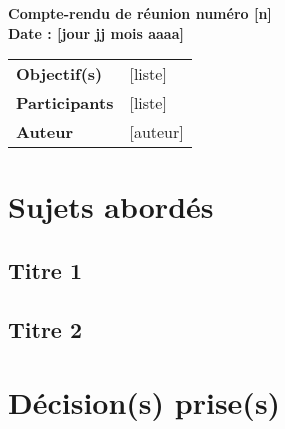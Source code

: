 \documentclass[a4wide,10pt]{article}
\begin{document}
\thispagestyle{empty}

\begin{center}
\LARGE \bfseries  Compte-rendu de réunion numéro [n] \\
\large \bfseries  Date : [jour jj mois aaaa]

\vspace{0.33cm}
\end{center}

\begin{center}
\begin{tabular}{ p{2.2cm}  p{13.6cm} }
\textbf{Objectif(s)} & [liste]  \\
\textbf{Participants} & [liste] \\ 
\textbf{Auteur} & [auteur]  \\
\end{tabular}
\end{center}

\section*{Sujets abordés}

\subsection*{Titre 1}

\subsection*{Titre 2}

\section*{Décision(s) prise(s)}


\subsection*{\color{red}{Prochaine réunion : }}
\end{document}
